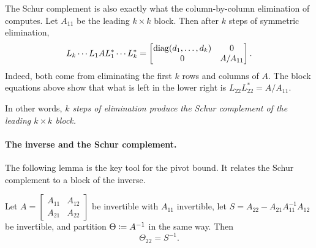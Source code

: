 The Schur complement is also exactly what the column-by-column elimination of  computes. Let $A_{11}$ be the leading $k \times k$ block. Then after $k$ steps of symmetric elimination,
\begin{equation}
  L_k \cdots L_1AL_1^\ast \cdots L_k^\ast = \begin{bmatrix} \operatorname{diag}(d_1, \dots, d_k) & 0 \\ 0 & A/A_{11} \end{bmatrix}.
\end{equation}
Indeed, both come from eliminating the first $k$ rows and columns of $A$. The block equations above show that what is left in the lower right is $L_{22}L_{22}^\ast = A/A_{11}$.

In other words, \emph{$k$ steps of elimination produce the Schur complement of the leading $k \times k$ block.}

\paragraph{The inverse and the Schur complement.} The following lemma is the key tool for the pivot bound. It relates the Schur complement to a block of the inverse.

\begin{lemma}
  \label{lem:schur-inverse}
  Let $A = \left[\begin{smallmatrix} A_{11} & A_{12} \\ A_{21} & A_{22} \end{smallmatrix}\right]$ be invertible with $A_{11}$ invertible, let $S = A_{22} - A_{21}A_{11}^{-1}A_{12}$ be invertible, and partition $\Theta \coloneqq A^{-1}$ in the same way. Then
  \begin{equation}
    \Theta_{22} = S^{-1}.
  \end{equation}
\end{lemma}


